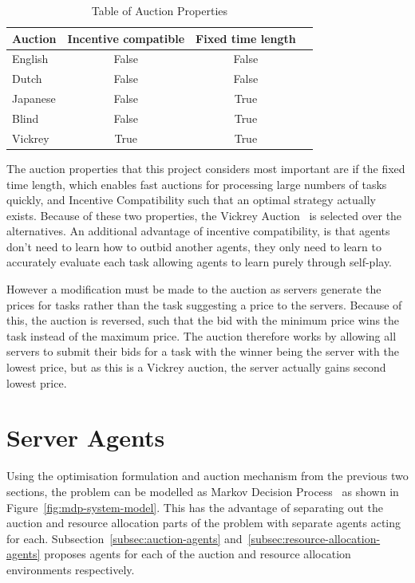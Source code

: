 \begin{table}[h]
    \centering
    \begin{tabular}{|l|c|c|c|} \hline
        \textbf{Auction}  & \textbf{Incentive compatible} & \textbf{Fixed time length} \\ \hline
        English           & False                         & False            \\ \hline
        Dutch             & False                         & False            \\ \hline
        Japanese          & False                         & True             \\ \hline
        Blind             & False                         & True             \\ \hline
        Vickrey           & True                          & True             \\ \hline
    \end{tabular}
    \caption{Table of Auction Properties}
    \label{tab:auction-properties}
\end{table}

The auction properties that this project considers most important are if the fixed time length, which enables fast
auctions for processing large numbers of tasks quickly, and Incentive Compatibility such that an optimal strategy actually exists.
Because of these two properties, the Vickrey Auction~\citep{vickrey} is selected over the alternatives. An additional
advantage of incentive compatibility, is that agents don't need to learn how to outbid another agents, they only need to
learn to accurately evaluate each task allowing agents to learn purely through self-play.

However a modification must be made to the auction as servers generate the prices for tasks rather than the task
suggesting a price to the servers. Because of this, the auction is reversed, such that the bid with the minimum price
wins the task instead of the maximum price. The auction therefore works by allowing all servers to submit their bids for
a task with the winner being the server with the lowest price, but as this is a Vickrey auction, the server actually
gains second lowest price.

\section{Server Agents}
\label{sec:server-agents}
Using the optimisation formulation and auction mechanism from the previous two sections, the problem can be modelled as
Markov Decision Process~\citep{Bel} as shown in Figure~\ref{fig:mdp-system-model}. This has the advantage of separating
out the auction and resource allocation parts of the problem with separate agents acting for each.
Subsection~\ref{subsec:auction-agents} and~\ref{subsec:resource-allocation-agents} proposes agents
for each of the auction and resource allocation environments respectively.

